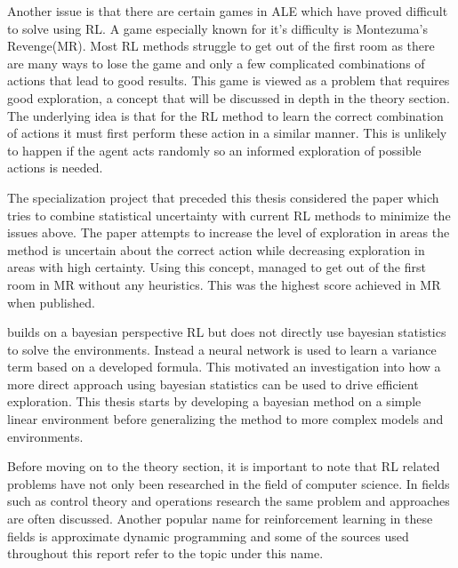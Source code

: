 Another issue is that there are certain games in ALE which have proved difficult to solve using RL. A game especially known for it's difficulty is Montezuma's Revenge(MR). Most RL methods struggle to get out of the first room as there are many ways to lose the game and only a few complicated combinations of actions that lead to good results. This game is viewed as a problem that requires good exploration, a concept that will be discussed in depth in the theory section. The underlying idea is that for the RL method to learn the correct combination of actions it must first perform these action in a similar manner. This is unlikely to happen if the agent acts randomly so an informed exploration of possible actions is needed.

The specialization project that preceded this thesis considered the paper \cite{donoghue_2017} which tries to combine statistical uncertainty with current RL methods to minimize the issues above. The paper attempts to increase the level of exploration in areas the method is uncertain about the correct action while decreasing exploration in areas with high certainty. Using this concept, \cite{donoghue_2017} managed to get out of the first room in MR without any heuristics. This was the highest score achieved in MR when published.

\cite{donoghue_2017} builds on a bayesian perspective RL but does not directly use bayesian statistics to solve the environments. Instead a neural network is used to learn a variance term based on a developed formula. This motivated an investigation into how a more direct approach using bayesian statistics can be used to drive efficient exploration. This thesis starts by developing a bayesian method on a simple linear environment before generalizing the method to more complex models and environments.

Before moving on to the theory section, it is important to note that RL related problems have not only been researched in the field of computer science. In fields such as control theory and operations research the same problem and approaches are often discussed. Another popular name for reinforcement learning in these fields is approximate dynamic programming and some of the sources used throughout this report refer to the topic under this name. \citep[p.~16]{powell_2011}

\cleardoublepage